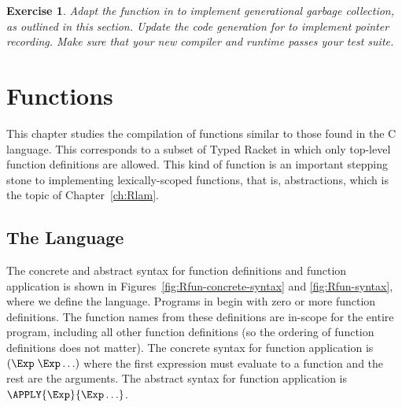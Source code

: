 \documentclass[11pt]{book}
\newtheorem{exercise}[theorem]{Exercise}
\begin{document}
\begin{exercise}\normalfont
  Adapt the  function in  to implement
  generational garbage collection, as outlined in this section.
  Update the code generation for  to implement
  pointer recording. Make sure that your new compiler and runtime
  passes your test suite.
\end{exercise}


\chapter{Functions}
\label{ch:Rfun}

This chapter studies the compilation of functions similar to those
found in the C language. This corresponds to a subset of Typed Racket
in which only top-level function definitions are allowed. This kind of
function is an important stepping stone to implementing
lexically-scoped functions, that is,  abstractions, which
is the topic of Chapter~\ref{ch:Rlam}.

\section{The \LangFun{} Language}

The concrete and abstract syntax for function definitions and function
application is shown in Figures~\ref{fig:Rfun-concrete-syntax} and
\ref{fig:Rfun-syntax}, where we define the \LangFun{} language.  Programs in
\LangFun{} begin with zero or more function definitions.  The function
names from these definitions are in-scope for the entire program,
including all other function definitions (so the ordering of function
definitions does not matter). The concrete syntax for function
application is $(\Exp \; \Exp \ldots)$
where the first expression must
evaluate to a function and the rest are the arguments.
The abstract syntax for function application is
$\APPLY{\Exp}{\Exp\ldots}$.

\end{document}
